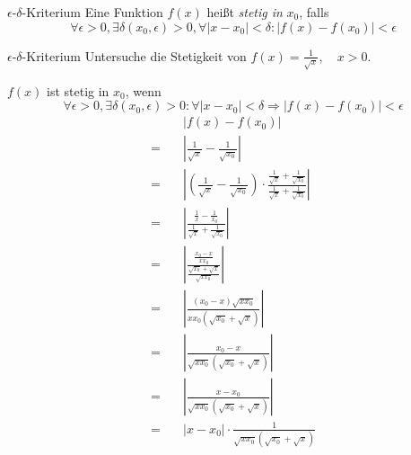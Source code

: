 \documentclass[german]{../spicker}
\renewcommand{\abs}[1]{\left| #1 \right|}
\begin{document}
\begin{defi}{$\epsilon$-$\delta$-Kriterium}
    Eine Funktion $f(x)$ heißt \emph{stetig in} $x_0$, falls
    $$
        \forall \epsilon > 0, \exists \delta(x_0, \epsilon) > 0, \forall \abs{x-x_0} < \delta : \abs{f(x)-f(x_0)} < \epsilon
    $$
\end{defi}

\begin{example}{$\epsilon$-$\delta$-Kriterium}
    Untersuche die Stetigkeit von $f(x) = \frac{1}{\sqrt{x}}, \quad x > 0$.

    $f(x)$ ist stetig in $x_0$, wenn
    $$\forall \epsilon > 0, \exists \delta (x_0, \epsilon) > 0: \forall \abs{x-x_0} < \delta \Rightarrow \abs{f(x)-f(x_0)} < \epsilon$$
    $$
        \begin{aligned}
                       & \abs{f(x)-f(x_0)}                                                                                                                                        \\
            = \quad    & \abs{\frac{1}{\sqrt{x}}-\frac{1}{\sqrt{x_0}}}                                                                                                            \\
            = \quad    & \abs{\left(\frac{1}{\sqrt{x}}-\frac{1}{\sqrt{x_0}}\right) \cdot \frac{\frac{1}{\sqrt{x}}+\frac{1}{\sqrt{x_0}}}{\frac{1}{\sqrt{x}}+\frac{1}{\sqrt{x_0}}}} \\
            = \quad    & \abs{\frac{\frac{1}{x}-\frac{1}{x_0}}{\frac{1}{\sqrt{x}}+\frac{1}{\sqrt{x_0}}}}                                                                          \\
            = \quad    & \abs{\frac{\frac{x_0-x}{x x_0}}{\frac{\sqrt{x_0} + \sqrt{x}}{ \sqrt{x  x_0}}}}                                                                           \\
            = \quad    & \abs{ \frac{(x_0 - x)  \sqrt{x x_0} }{ x x_0  \left( \sqrt{x_0} + \sqrt{x} \right) } }                                                                   \\
            = \quad    & \abs{ \frac{x_0 - x }{ \sqrt{x x_0 } \left( \sqrt{x_0} + \sqrt{x} \right) } }                                                                            \\
            = \quad    & \abs{ \frac{x-x_0 }{ \sqrt{x x_0 } \left( \sqrt{x_0} + \sqrt{x} \right) } }                                                                              \\
            = \quad    & \abs{x-x_0} \cdot \frac{1 }{ \sqrt{x x_0 } \left( \sqrt{x_0} + \sqrt{x} \right) }                                                                        \\

\end{aligned}$$
\end{example}
\end{document}
